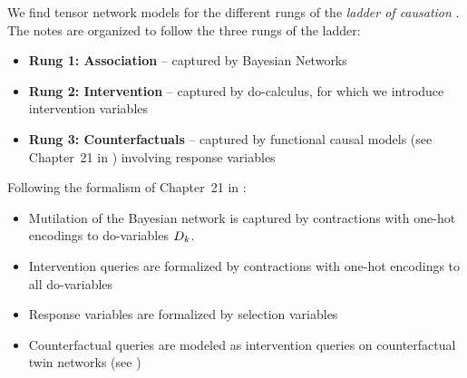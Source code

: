We find tensor network models for the different rungs of the \emph{ladder of causation} \cite{pearl_book_2018}.
The notes are organized to follow the three rungs of the ladder:
\begin{itemize}
    \item \textbf{Rung 1: Association} -- captured by Bayesian Networks
    \item \textbf{Rung 2: Intervention} -- captured by do-calculus, for which we introduce intervention variables
    \item \textbf{Rung 3: Counterfactuals} -- captured by functional causal models (see Chapter~21 in \cite{koller_probabilistic_2009}) involving response variables
\end{itemize}

Following the formalism of Chapter~21 in \cite{koller_probabilistic_2009}:
\begin{itemize}
    \item Mutilation of the Bayesian network is captured by contractions with one-hot encodings to do-variables $D_{k}$.
    \item Intervention queries are formalized by contractions with one-hot encodings to all do-variables
    \item Response variables are formalized by selection variables
    \item Counterfactual queries are modeled as intervention queries on counterfactual twin networks (see \cite[Chapter~21]{koller_probabilistic_2009})
\end{itemize}
